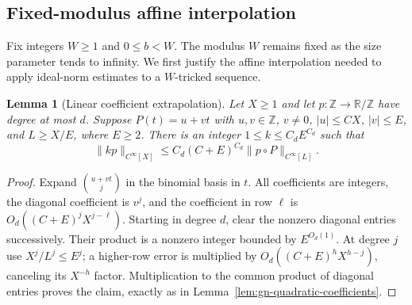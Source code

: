 \documentclass[11pt]{article}
\newtheorem{lemma}[theorem]{Lemma}
\theoremstyle{definition}
\theoremstyle{remark}
\begin{document}
\subsection{Fixed-modulus affine interpolation}
\label{sec:ga-affine}

Fix integers $W\geq1$ and $0\leq b<W$. The modulus $W$ remains fixed
as the size parameter tends to infinity. We first justify the affine
interpolation needed to apply ideal-norm estimates to a $W$-tricked
sequence.

\begin{lemma}[Linear coefficient extrapolation]\label{lem:ga-linear-coefficients}
Let $X\geq1$ and let $p:\mathbb Z\to\mathbb R/\mathbb Z$ have degree at most $d$.
Suppose $P(t)=u+vt$ with $u,v\in\mathbb Z$, $v\ne0$,
$|u|\leq C X$, $|v|\leq E$, and $L\geq X/E$, where $E\geq2$.
There is an integer $1\leq k\leq C_dE^{C_d}$ such that
\[
 \|kp\|_{C^\infty[X]}
 \leq C_d(C+E)^{C_d}\|p\circ P\|_{C^\infty[L]}.
\]
\end{lemma}
\begin{proof}
Expand $\binom{u+vt}j$ in the binomial basis in $t$. All coefficients
are integers, the diagonal coefficient is $v^j$, and the coefficient in
row $\ell$ is $O_d((C+E)^jX^{j-\ell})$. Starting in degree $d$, clear
the nonzero diagonal entries successively. Their product is a nonzero
integer bounded by $E^{O_d(1)}$. At degree $j$ use
$X^j/L^j\leq E^j$; a higher-row error is multiplied by
$O_d((C+E)^hX^{h-j})$, canceling its $X^{-h}$ factor. Multiplication
to the common product of diagonal entries proves the claim, exactly
as in Lemma~\ref{lem:gn-quadratic-coefficients}.
\end{proof}
\end{document}
